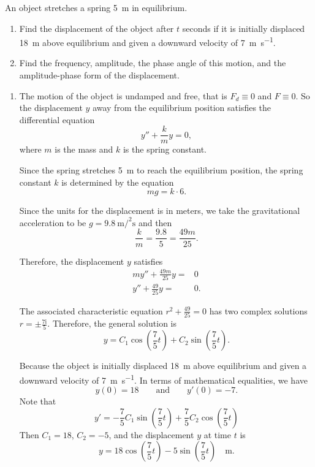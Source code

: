 \begin{example}
An object stretches a spring \SI{5}{\meter} in equilibrium.
\begin{enumerate}
  \item 
  Find the displacement of the object after $t$ seconds if it is initially displaced \SI{18}{\meter} above equilibrium and given a downward velocity of \SI{7}{\meter\per\second}.
  \item Find the frequency, amplitude, the phase angle of this motion, and the amplitude-phase form of the displacement.
\end{enumerate}
\end{example}
\begin{solution}
  \begin{enumerate}
    \item 
  The motion of the object is undamped and free, that is $F_d\equiv 0$ and $F\equiv 0$. So the displacement $y$ away from the equilibrium position satisfies the differential equation
  \[y''+\frac{k}{m}y=0,\]
  where $m$ is the mass and $k$ is the spring constant.

  Since the spring stretches \SI{5}{\meter} to reach the equilibrium position, the spring constant $k$ is determined by the equation
  \[mg=k\cdot 6.\]

  Since the units for the displacement is in meters, we take the gravitational acceleration to be $g=\SI{9.8}{\meter\square\per\second}$ and then
  \[\frac{k}{m}=\frac{9.8}{5}=\frac{49m}{25}.\]

  Therefore, the displacement $y$ satisfies
  \[
  \begin{aligned}
    my''+\frac{49m}{25}y=&0\\
    y''+\frac{49}{25}y=&0.
  \end{aligned}  
  \]

The associated characteristic equation $r^2+\frac{49}{25}=0$ has two complex solutions $r=\pm\frac{7\mathrm{i}}{5}$. Therefore, the general solution is
\[y=C_1\cos\left(\frac{7}{5}t\right)+C_2\sin\left(\frac{7}{5}t\right).\]

Because the object is initially displaced \SI{18}{\meter} above equilibrium and given a downward velocity of \SI{7}{\meter\per\second}. In terms of mathematical equalities, we have
\[y(0)=18\qquad\text{and}\qquad y'(0)=-7.\]
Note that 
\[y'=-\frac{7}{5}C_1\sin\left(\frac{7}{5}t\right)+\frac{7}{5}C_2\cos\left(\frac{7}{5}t\right)\]
Then $C_1=18$, $C_2=-5$, and the displacement $y$ at time $t$ is
\[y=18\cos\left(\frac{7}{5}t\right)-5\sin\left(\frac{7}{5}t\right)\quad \si{\meter}.\]


\end{enumerate}
\end{solution}
